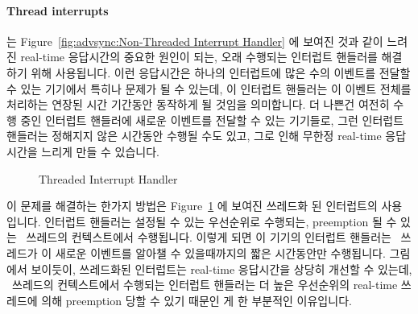 \paragraph{Thread interrupts}
는
Figure~\ref{fig:advsync:Non-Threaded Interrupt Handler} 에 보여진 것과 같이
느려진 real-time 응답시간의 중요한 원인이 되는, 오래 수행되는 인터럽트 핸들러를
해결하기 위해 사용됩니다.
이런 응답시간은 하나의 인터럽트에 많은 수의 이벤트를 전달할 수 있는 기기에서
특히나 문제가 될 수 있는데, 이 인터럽트 핸들러는 이 이벤트 전체를 처리하는
연장된 시간 기간동안 동작하게 될 것임을 의미합니다.
더 나쁜건 여전히 수행 중인 인터럽트 핸들러에 새로운 이벤트를 전달할 수 있는
기기들로, 그런 인터럽트 핸들러는 정해지지 않은 시간동안 수행될 수도 있고, 그로
인해 무한정 real-time 응답시간을 느리게 만들 수 있습니다.

\begin{figure}[tb]
\centering
{}
\caption{Threaded Interrupt Handler}
\label{fig:advsync:Threaded Interrupt Handler}
\end{figure}

이 문제를 해결하는 한가지 방법은
Figure~\ref{fig:advsync:Threaded Interrupt Handler} 에 보여진 쓰레드화 된
인터럽트의 사용입니다.
인터럽트 핸들러는 설정될 수 있는 우선순위로 수행되는, preemption 될 수 있는
\IRQ\ 쓰레드의 컨텍스트에서 수행됩니다.
이렇게 되면 이 기기의 인터럽트 핸들러는 \IRQ\ 쓰레드가 이 새로운 이벤트를
알아챌 수 있을때까지의 짧은 시간동안만 수행됩니다.
그림에서 보이듯이, 쓰레드화된 인터럽트는 real-time 응답시간을 상당히 개선할 수
있는데, \IRQ\ 쓰레드의 컨텍스트에서 수행되는 인터럽트 핸들러는 더 높은
우선순위의 real-time 쓰레드에 의해 preemption 당할 수 있기 때문인 게 한
부분적인 이유입니다.
\iffalse

